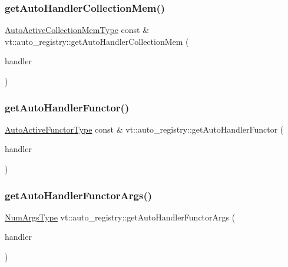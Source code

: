 \subsubsection{\texorpdfstring{get\+Auto\+Handler\+Collection\+Mem()}{getAutoHandlerCollectionMem()}}
{\footnotesize\ttfamily \hyperlink{namespacevt_1_1auto__registry_af5d102e15ae09e22dbc560f5b64ec758}{Auto\+Active\+Collection\+Mem\+Type} const  \& vt\+::auto\+\_\+registry\+::get\+Auto\+Handler\+Collection\+Mem (\begin{DoxyParamCaption}\item[{\hyperlink{namespacevt_af64846b57dfcaf104da3ef6967917573}{Handler\+Type} const}]{handler }\end{DoxyParamCaption})\hspace{0.3cm}{\ttfamily [inline]}}

\mbox{\label{namespacevt_1_1auto__registry_ae91f2c29e8baf7efbb9887bbf0067403}} 
\subsubsection{\texorpdfstring{get\+Auto\+Handler\+Functor()}{getAutoHandlerFunctor()}}
{\footnotesize\ttfamily \hyperlink{namespacevt_1_1auto__registry_a092979b3ed6cf9e21e6a5823fdaa0c12}{Auto\+Active\+Functor\+Type} const  \& vt\+::auto\+\_\+registry\+::get\+Auto\+Handler\+Functor (\begin{DoxyParamCaption}\item[{\hyperlink{namespacevt_af64846b57dfcaf104da3ef6967917573}{Handler\+Type} const}]{handler }\end{DoxyParamCaption})\hspace{0.3cm}{\ttfamily [inline]}}

\mbox{\label{namespacevt_1_1auto__registry_a410be4f1a89d51d09a347c72d650ea8c}} 
\subsubsection{\texorpdfstring{get\+Auto\+Handler\+Functor\+Args()}{getAutoHandlerFunctorArgs()}}
{\footnotesize\ttfamily \hyperlink{namespacevt_1_1auto__registry_aebda1d9d765bc9147dc654ad0712c936}{Num\+Args\+Type} vt\+::auto\+\_\+registry\+::get\+Auto\+Handler\+Functor\+Args (\begin{DoxyParamCaption}\item[{\hyperlink{namespacevt_af64846b57dfcaf104da3ef6967917573}{Handler\+Type} const}]{handler }\end{DoxyParamCaption})\hspace{0.3cm}{\ttfamily [inline]}}

